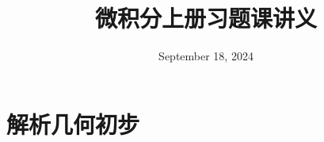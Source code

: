 \documentclass[lang=cn,10pt]{elegantbook}
\title{微积分\Rmnum{1}上册习题课讲义}
\date{September 18, 2024}
\begin{document}
\maketitle
\frontmatter

\tableofcontents

\mainmatter
\chapter{解析几何初步}


\nocite{*}
\appendix
\end{document}

